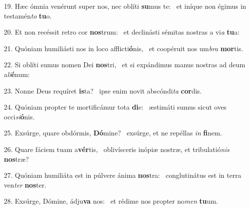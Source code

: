 19. Hæc ómnia venérunt super nos, nec oblíti \textbf{su}mus te: \ast\  et iníque non égimus in testamén\textit{to} \textbf{tu}o.\

20. Et non recéssit retro cor \textbf{nos}trum: \ast\  et declinásti sémitas nostras a vi\textit{a} \textbf{tu}a:\

21. Quóniam humiliásti nos in loco afflicti\textbf{ó}nis, \ast\  et coopéruit nos um\textit{bra} \textbf{mor}tis.\

22. Si oblíti sumus nomen Dei \textbf{nos}tri, \ast\  et si expándimus manus nostras ad deum a\textit{li}\textbf{é}num:\

23. Nonne Deus requíret \textbf{is}ta? \ast\  ipse enim novit abscóndi\textit{ta} \textbf{cor}dis.\

24. Quóniam propter te mortificámur tota \textbf{di}e: \ast\  æstimáti sumus sicut oves occi\textit{si}\textbf{ó}nis.\

25. Exsúrge, quare obdórmis, \textbf{Dó}mine? \ast\  exsúrge, et ne repéllas \textit{in} \textbf{fi}nem.\

26. Quare fáciem tuam a\textbf{vér}tis, \ast\  oblivísceris inópiæ nostræ, et tribulatió\textit{nis} \textbf{nos}træ?\

27. Quóniam humiliáta est in púlvere ánima \textbf{nos}tra: \ast\  conglutinátus est in terra ven\textit{ter} \textbf{nos}ter.\

28. Exsúrge, Dómine, ádju\textbf{va} nos: \ast\  et rédime nos propter no\textit{men} \textbf{tu}um.\

